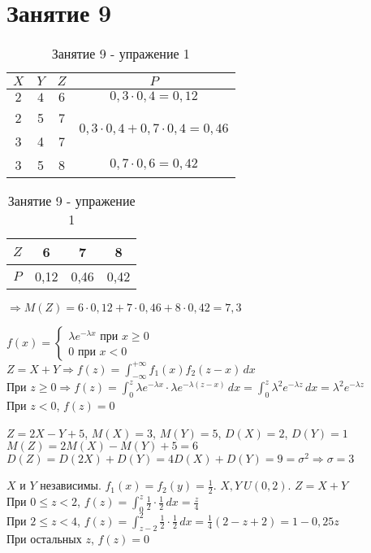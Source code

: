 \section*{Занятие 9}
\begin{exercise}[1]
	\begin{table}[h]
		\centering
		\begin{tabular}{|c|c|c|c|}
			\hline
			$X$ & $Y$ & $Z$ & $P$ \\ \hline
			$2$ & $4$ & $6$ & $0,3 \cdot 0,4 = 0,12$ \\ \hline
			2 & 5 & 7 & \multirow{2}{*}{$0,3 \cdot 0,4 + 0,7 \cdot 0,4 = 0,46$} \\ \cline{1-3}
			3 & 4 & 7 & \\ \hline
			3 & 5 & 8 & $0,7 \cdot 0,6 = 0,42$ \\ \hline 
		\end{tabular}
		\begin{tabular}{|c|ccc|}
			\hline
			$Z$ & 6 & 7 & 8 \\ \hline
			$P$ & 0,12 & 0,46 & 0,42 \\ \hline
		\end{tabular}
	\caption{Занятие 9 - упражение 1}
	\end{table}
	$\Rightarrow M(Z) = 6 \cdot 0,12 + 7 \cdot 0,46 + 8 \cdot 0,42 = 7,3$
\end{exercise}

\begin{exercise}[2]
	$f(x) = \begin{cases}
		\lambda e^{-\lambda x} \text{ при } x \geq 0 \\
		0 \text{ при } x < 0
	\end{cases}$ \\
	$Z = X+Y \Rightarrow f(z) = \int_{-\infty}^{+\infty}f_1(x) f_2(z-x)\,dx$ \\
	При $z \geq 0 \Rightarrow f(z) = \int_{0}^{z}\lambda e^{-\lambda x} \cdot \lambda e^{-\lambda (z-x)}\,dx = \int_{0}^{z}\lambda^2 e^{-\lambda z}\,dx = \lambda^2 e^{-\lambda z}$ \\
	При $z < 0$, $f(z)=0$
\end{exercise}

\begin{exercise}[3]
	$Z=2X-Y+5$, $M(X)=3$, $M(Y)=5$, $D(X)=2$, $D(Y)=1$ \\
	$M(Z)=2M(X)-M(Y)+5=6$ \\
	$D(Z)=D(2X)+D(Y)=4D(X)+D(Y)=9=\sigma^2 \Rightarrow \sigma=3$
\end{exercise}

\begin{exercise}[4]
	$X$ и $Y$ независимы. $f_1(x) = f_2(y) = \frac{1}{2}$. $X, Y ~ U(0, 2)$. $Z=X+Y$ \\
	При $0 \leq z < 2$, $f(z) = \int_{0}^{z}\frac{1}{2} \cdot \frac{1}{2}\,dx = \frac{z}{4}$ \\
	При $2 \leq z < 4$, $f(z) = \int_{z-2}^{2}\frac{1}{2} \cdot \frac{1}{2}\,dx = \frac{1}{4}(2-z+2) = 1-0,25z$ \\
	При остальных $z$, $f(z)=0$
\end{exercise}

